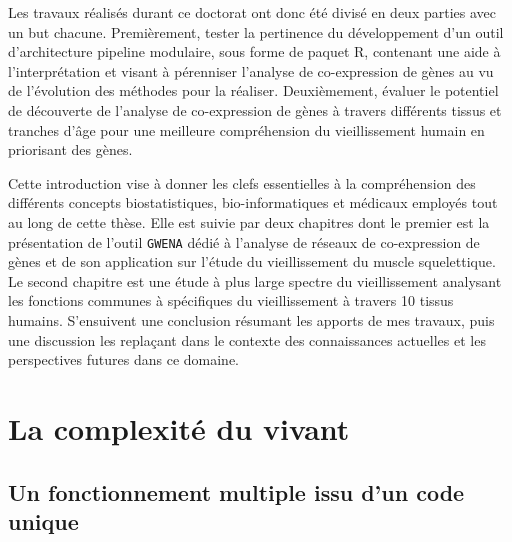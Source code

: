 Les travaux réalisés durant ce doctorat ont donc été divisé en deux parties avec un but chacune. Premièrement, tester la pertinence du développement d'un outil d'architecture pipeline modulaire, sous forme de paquet R, contenant une aide à l'interprétation et visant à pérenniser l'analyse de co-expression de gènes au vu de l'évolution des méthodes pour la réaliser. Deuxièmement, évaluer le potentiel de découverte de l'analyse de co-expression de gènes à travers différents tissus et tranches d'âge pour une meilleure compréhension du vieillissement humain en priorisant des gènes.

Cette introduction vise à donner les clefs essentielles à la compréhension des différents concepts biostatistiques, bio-informatiques et médicaux employés tout au long de cette thèse. Elle est suivie par deux chapitres dont le premier est la présentation de l'outil \verb+GWENA+ dédié à l'analyse de réseaux de co-expression de gènes et de son application sur l'étude du vieillissement du muscle squelettique. Le second chapitre est une étude à plus large spectre du vieillissement analysant les fonctions communes à spécifiques du vieillissement à travers 10 tissus humains. S’ensuivent une conclusion résumant les apports de mes travaux, puis une discussion les replaçant dans le contexte des connaissances actuelles et les perspectives futures dans ce domaine.




\section{La complexité du vivant}

\subsection{Un fonctionnement multiple issu d'un code unique}

